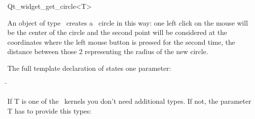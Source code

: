 
\begin{ccRefClass}{Qt_widget_get_circle<T>}

\ccDefinition
An object of type \ccRefName\ creates a \cgal\ circle in this way: one 
left click on the mouse will be the center of the circle and the
second point will be considered at the coordinates where the left
mouse button is pressed for the second time, the distance
between those 2 representing the radius of the new circle.


\ccParameters

The full template declaration of  states one parameter:

\begin{tabbing}
 \=\\
\end{tabbing}

If T is one of the \cgal\ kernels you don't need additional types. If
not, the parameter T has to provide this types:

\ccTypes
{}

\ccInheritsFrom
{}

\ccGlue

\ccCreation
{}


\end{ccRefClass}









